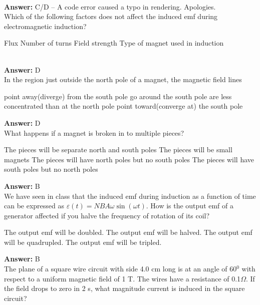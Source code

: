 \documentclass[12pt,addpoints]{exam}
\begin{document}
{{{\begin{questions}
\begin{oneparchoices}
					\end{oneparchoices}
					\\ \textbf{Answer:} C/D -- A code error caused a typo in rendering. Apologies.\\ 
					\question Which of the following factors does not affect the induced emf during electromagnetic induction? \\ \begin{oneparchoices}
						\choice Flux
						\choice Number of turns
						\choice Field strength
						\choice Type of magnet used in induction
					\end{oneparchoices}
					\\ \textbf{Answer:} D\\ 
					\question In the region just outside the north pole of a magnet, the magnetic field lines
					\begin{choices}
						\choice point away(diverge) from the south pole
						\choice go around the south pole
						\choice are less concentrated than at the north pole
						\choice point toward(converge at) the south pole
					\end{choices}
					\textbf{Answer:} D\\ 
					\question What happens if a magnet is broken in to  multiple pieces? 
					\begin{choices}
						\choice The pieces will be separate north and south poles
						\choice The pieces will be small magnets
						\choice The pieces will have north poles but no south poles
						\choice The pieces will have south poles but no north poles
					\end{choices}
					\textbf{Answer:} B\\ 
					\question We have seen in class that the induced emf during induction as a function of time can be expressed as $\varepsilon(t)=NBA\omega\sin(\omega t)$. How is the output emf of a generator affected if you halve the frequency of rotation of its coil?
					\begin{choices}
						\choice The output emf will be doubled.
						\choice The output emf will be halved.
						\choice The output emf will be quadrupled.
						\choice The output emf will be tripled.
					\end{choices}
					\textbf{Answer:} B\\ 
					\question The plane of a square wire circuit with side 4.0 cm long is at an angle of 60$^0$ with respect to a uniform magnetic field of 1 T. The wires have a resistance of 0.1$\Omega$. If the field drops to zero in 2 s, what magnitude current is induced in the square circuit? \\ \begin{oneparchoices}

\end{oneparchoices}
\end{questions}}}}
\end{document}
